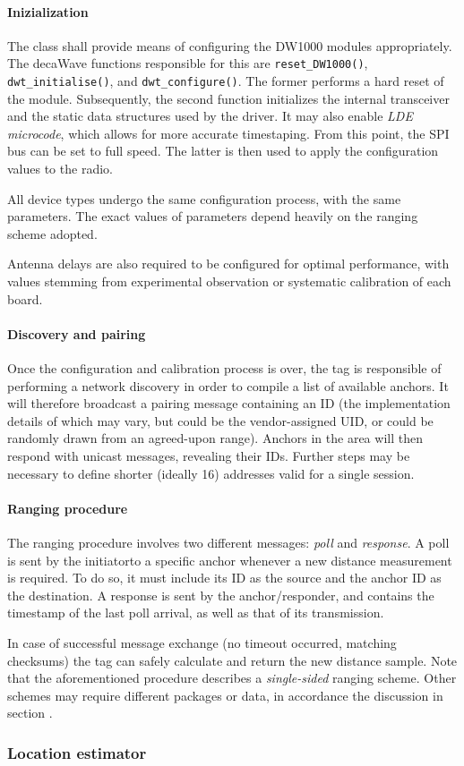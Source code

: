 \paragraph{Inizialization}
The class shall provide means of configuring the DW1000 modules appropriately.
The decaWave functions responsible for this are \texttt{reset\_DW1000()},  \texttt{dwt\_initialise()}, and \texttt{dwt\_configure()}.
The former performs a hard reset of the module.
Subsequently, the second function initializes the internal transceiver and the static data structures used by the driver.
It may also enable \emph{LDE microcode}, which allows for more accurate timestaping.
From this point, the SPI bus can be set to full speed.
The latter is then used to apply the configuration values to the radio.

All device types undergo the same configuration process, with the same parameters.
The exact values of parameters depend heavily on the ranging scheme adopted.

Antenna delays are also required to be configured for optimal performance, with values stemming from experimental observation or systematic calibration of each board.


\paragraph{Discovery and pairing}
Once the configuration and calibration process is over, the tag is responsible of performing a network discovery in order to compile a list of available anchors.
It will therefore broadcast a pairing message containing an ID (the implementation details of which may vary, but could be the vendor-assigned UID, or could be randomly drawn from an agreed-upon range).
Anchors in the area will then respond with unicast messages, revealing their IDs.
Further steps may be necessary to define shorter (ideally \SI{16}{\bit}) addresses valid for a single session.


\paragraph{Ranging procedure}
The ranging procedure involves two different messages: \emph{poll} and \emph{response}.
A poll is sent by the initiator\tag to a specific anchor whenever a new distance measurement is required.
To do so, it must include its ID as the source and the anchor ID as the destination.
A response is sent by the anchor/responder, and contains the timestamp of the last poll arrival, as well as that of its transmission.

In case of successful message exchange (no timeout occurred, matching checksums) the tag can safely calculate and return the new distance sample.
Note that the aforementioned procedure describes a \emph{single-sided} ranging scheme.
Other schemes may require different packages or data, in accordance the discussion in section .


\subsubsection{Location estimator}

